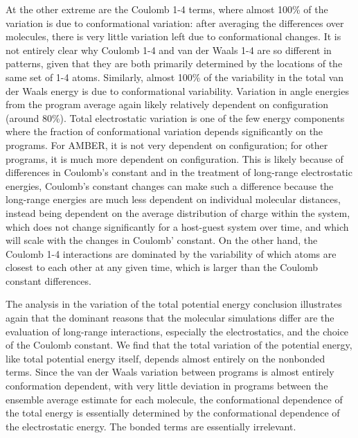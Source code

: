 At the other extreme are the Coulomb 1-4 terms, where almost 100\% of
the variation is due to conformational variation: after averaging the
differences over molecules, there is very little variation left due to
conformational changes. It is not entirely clear why Coulomb 1-4 and
van der Waals 1-4 are so different in patterns, given that they are
both primarily determined by the locations of the same set of 1-4 atoms.
Similarly, almost 100\% of the variability in the total van der Waals
energy is due to conformational variability.  Variation in angle
energies from the program average again likely relatively dependent on
configuration (around 80\%). 
Total electrostatic variation is one of the few energy components
where the fraction of conformational variation depends significantly
on the programs.  For AMBER, it is not very dependent on
configuration; for other programs, it is much more dependent on
configuration. This is likely because of differences in Coulomb's
constant and in the treatment of long-range electrostatic energies,
Coulomb's constant changes can make such a difference because the
long-range energies are much less dependent on individual molecular
distances, instead being dependent on the average distribution of
charge within the system, which does not change significantly for a
host-guest system over time, and which will scale with the changes in
Coulomb' constant.  On the other hand, the Coulomb 1-4 interactions
are dominated by the variability of which atoms are closest to each
other at any given time, which is larger than the Coulomb constant
differences.

The analysis in the variation of the total potential energy conclusion
illustrates again that the dominant reasons that the molecular
simulations differ are the evaluation of long-range interactions,
especially the electrostatics, and the choice of the Coulomb
constant. We find that the total variation of the potential energy,
like total potential energy itself, depends almost entirely on the
nonbonded terms.  Since the van der Waals variation between programs
is almost entirely conformation dependent, with very little deviation
in programs between the ensemble average estimate for each molecule,
the conformational dependence of the total energy is essentially
determined by the conformational dependence of the electrostatic
energy. The bonded terms are essentially irrelevant.


